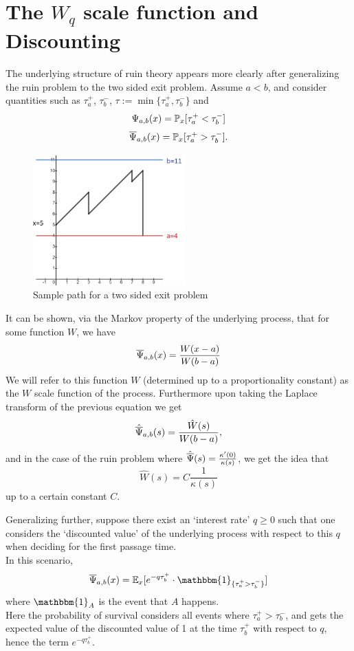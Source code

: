 \section{The $W_q$ scale function and Discounting}
The underlying structure of ruin theory appears more clearly after generalizing the ruin problem to the two sided exit problem. Assume $a<b$, and consider quantities such as $\tau_a^+$, $\tau_b^-$, $\tau := \min\{ \tau_a^+, \tau_b^- \}$ and
\[ \Psi_{a,b}(x) = \mathbb{P}_x [\tau_a^+ < \tau_b^-] \]
\[ \overline{\Psi}_{a,b}(x) = \mathbb{P}_x [\tau_a^+ > \tau_b^-]. \]

\begin{figure}
\caption{Sample path for a two sided exit problem}
\begin{center}
\includegraphics [width=2.3in]{twosided2.png}
\end{center}
\end{figure}

It can be shown, via the Markov property of the underlying process, that for some function $W$, we have
\[ \overline{\Psi}_{a,b}(x) = \frac{W(x-a)}{W(b-a)}\]
We will refer to this function $W$ (determined up to a proportionality constant) as the $W$ scale function of the process.
Furthermore upon taking the Laplace transform of the previous equation we get
\[ \hat {\overline{\Psi}}_{a,b}(s) = \frac{\hat W(s)}{W(b-a)}, \]
and in the case of the ruin problem where $\hat {\overline{\Psi}}(s) = \frac{\kappa'(0)}{\kappa(s)}$, we get the idea that \[\hat W(s) = C \frac{1}{\kappa(s)}\] up to a certain constant $C$.

Generalizing further, suppose there exist an `interest rate' $q \geq 0$ such that one considers the `discounted value' of the underlying process with respect to this $q$ when deciding for the  first passage time.\\
In this scenario,
\[ \sRui_{a,b}(x) = \mathbb{E}_x [ e^{-q \tau_b^+} \cdot \mathbbm{1}_{\{\tau_a^+ > \tau_b^-\}}] \]
where $\mathbbm{1}_{A}$ is the event that $A$ happens.\\
Here the probability of survival considers all events where $\tau_a^+ > \tau_b^-$, and gets the expected value of the discounted value of 1 at the time $\tau_b^+$ with respect to $q$, hence the term $e^{-q \tau_b^+}$.

